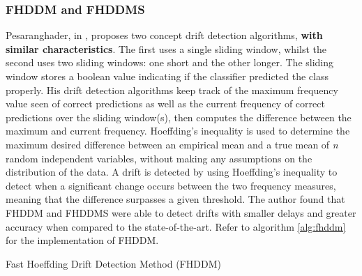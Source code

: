 \subsubsection{FHDDM and FHDDMS\label{section:fhddm/s}}
Pesaranghader, in \parencite{pesaranghader2018reservoirthesis,pesaranghader2018reservoir, pesaranghader2016fast}, proposes two concept drift detection algorithms, \textbf{with similar characteristics}. The first uses a single sliding window, whilst the second uses two sliding windows: one short and the other longer. The sliding window stores a boolean value indicating if the classifier predicted the class properly. His drift detection algorithms keep track of the maximum frequency value seen of correct predictions as well as the current frequency of correct predictions over the sliding window(s), then computes the difference between the maximum and current frequency. Hoeffding's inequality is used to determine the maximum desired difference between an empirical mean and a true mean of \textit{n} random independent variables, without making any assumptions on the distribution of the data. A drift is detected by using Hoeffding's inequality to detect when a significant change occurs between the two frequency measures, meaning that the difference surpasses a given threshold. The author found that FHDDM and FHDDMS were able to detect drifts with smaller delays and greater accuracy when compared to the state-of-the-art. Refer to algorithm \ref{alg:fhddm} for the implementation of FHDDM.

\begin{algorithm}
\caption{Fast Hoeffding Drift Detection Method (FHDDM) \label{alg:fhddm}\cite{pesaranghader2018reservoirthesis,pesaranghader2018reservoir, pesaranghader2016fast}}


\end{algorithm}


